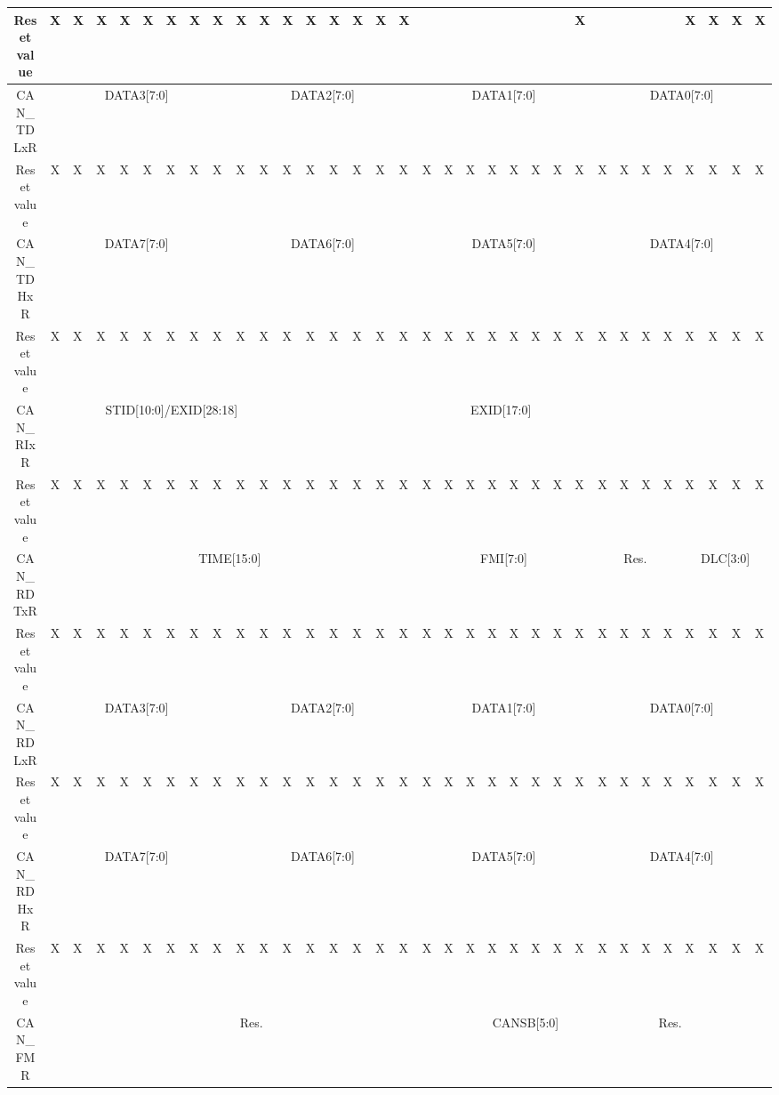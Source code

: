 \begin{table}[H]
{\begin{tabular}{|c|c|l|l|l|l|l|l|l|l|l|l|l|l|l|l|l|l|l|l|l|l|l|l|l|l|l|l|l|l|l|l|l|}
		\hline
		Reset value & X & X & X & X & X & X & X & X & X & X & X & X & X & X & X & X & & & & & & & & X & & & & & X & X & X & X \\
		\hline
		CAN\_TDLxR & \multicolumn{8}{c|}{DATA3[7:0]} & \multicolumn{8}{c|}{DATA2[7:0]} & \multicolumn{8}{c|}{DATA1[7:0]} & \multicolumn{8}{c|}{DATA0[7:0]} \\
		\hline
		Reset value & X & X & X & X & X & X & X & X & X & X & X & X & X & X & X & X & X & X & X & X & X & X & X & X & X & X & X & X & X & X & X & X \\
		\hline
		CAN\_TDHxR & \multicolumn{8}{c|}{DATA7[7:0]} & \multicolumn{8}{c|}{DATA6[7:0]} & \multicolumn{8}{c|}{DATA5[7:0]} & \multicolumn{8}{c|}{DATA4[7:0]} \\
		\hline
		Reset value & X & X & X & X & X & X & X & X & X & X & X & X & X & X & X & X & X & X & X & X & X & X & X & X & X & X & X & X & X & X & X & X \\
		\hline
		CAN\_RIxR & \multicolumn{11}{c|}{STID[10:0]/EXID[28:18]} & \multicolumn{18}{c|}{EXID[17:0]} & \rot{IDE} & \rot{RTR} & \rot{Res.} \\
		\hline
		Reset value & X & X & X & X & X & X & X & X & X & X & X & X & X & X & X & X & X & X & X & X & X & X & X & X & X & X & X & X & X & X & X & X \\
		\hline
		CAN\_RDTxR & \multicolumn{16}{c|}{TIME[15:0]} & \multicolumn{8}{c|}{FMI[7:0]} & \multicolumn{4}{c|}{Res.} & \multicolumn{4}{c|}{DLC[3:0]} \\
		\hline
		Reset value & X & X & X & X & X & X & X & X & X & X & X & X & X & X & X & X & X & X & X & X & X & X & X & X & X & X & X & X & X & X & X & X \\
		\hline
		CAN\_RDLxR & \multicolumn{8}{c|}{DATA3[7:0]} & \multicolumn{8}{c|}{DATA2[7:0]} & \multicolumn{8}{c|}{DATA1[7:0]} & \multicolumn{8}{c|}{DATA0[7:0]} \\
		\hline
		Reset value & X & X & X & X & X & X & X & X & X & X & X & X & X & X & X & X & X & X & X & X & X & X & X & X & X & X & X & X & X & X & X & X \\
		\hline
		CAN\_RDHxR & \multicolumn{8}{c|}{DATA7[7:0]} & \multicolumn{8}{c|}{DATA6[7:0]} & \multicolumn{8}{c|}{DATA5[7:0]} & \multicolumn{8}{c|}{DATA4[7:0]} \\
		\hline
		Reset value & X & X & X & X & X & X & X & X & X & X & X & X & X & X & X & X & X & X & X & X & X & X & X & X & X & X & X & X & X & X & X & X \\
		\hline
		CAN\_FMR & \multicolumn{18}{c|}{Res.} & \multicolumn{6}{c|}{CANSB[5:0]} & \multicolumn{7}{c|}{Res.} & \rot{FINIT} \\

\end{tabular}}
\end{table}
